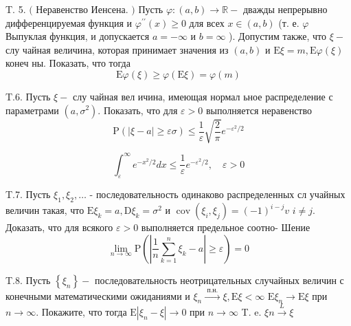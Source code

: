 \documentclass[a4paper,12pt]{article} %
\begin{document}
\begin{example}


T. 5. $($ Неравенство Иенсена. $)$ Пусть $\varphi:(a, b) \rightarrow \mathbb{R}-$ дважды непрерывно дифференцируемая функция и $\varphi^{\prime \prime}(x) \geq 0$ для всех $x \in(a, b)$ (т. е. $\varphi$ Выпуклая функция, и допускается $a=-\infty$ и $b=\infty$ ). Допустим также, что $\xi-$ слу чайная величина, которая принимает значения из $(a, b)$ и $\mathrm{E} \xi=m, \mathrm{E} \varphi(\xi)$ конеч ны. Показать, что тогда
$$
\mathrm{E} \varphi(\xi) \geq \varphi(\mathrm{E} \xi)=\varphi(m)
$$



\end{example}



\begin{example}



T.6. Пусть $\xi-$ слу чайная вел ичина, имеющая нормал ьное распределение с параметрами $\left(a, \sigma^{2}\right) .$ Показать, что для $\varepsilon>0$ выполняется неравенство
$$
\mathrm{P}(|\xi-a| \geq \varepsilon \sigma) \leq \frac{1}{\varepsilon} \sqrt{\frac{2}{\pi}} e^{-\varepsilon^{2} / 2}
$$

$$\int_{\varepsilon}^{\infty} e^{-x^{2} / 2} d x \leq \frac{1}{\varepsilon} e^{-\varepsilon^{2} / 2}, \quad \varepsilon>0$$

\end{example}



\begin{example}

T.7. Пусть $\xi_{1}, \xi_{2}, \ldots$ - последовательность одинаково распределенных сл учайных величин такая, что $\mathrm{E} \xi_{k}=a, \mathrm{D} \xi_{k}=\sigma^{2}$ и $\operatorname{cov}\left(\xi_{i}, \xi_{j}\right)=(-1)^{i-j} v$
$i \neq j .$ Доказать, что для всякого $\varepsilon>0$ выполняется предельное соотно-
Шение
$$
\lim _{n \rightarrow \infty} \mathrm{P}\left(\left|\frac{1}{n} \sum_{k=1}^{n} \xi_{k}-a\right| \geq \varepsilon\right)=0
$$




\end{example}





\begin{example}


T.8. Пусть $\left\{\xi_{n}\right\}-$ последовательность неотрицательных случайных величин с конечными математическими ожиданиями и $\xi_{n} \stackrel{\text { п.н. }}{\rightarrow} \xi, \mathrm{E} \xi<\infty$ $\mathrm{E} \xi_{n} \rightarrow \mathrm{E} \xi$ при $n \rightarrow \infty .$ Покажите, что тогда $\mathrm{E}\left|\xi_{n}-\xi\right| \rightarrow 0$ при $n \rightarrow \infty$
T. e. $\xi n \stackrel{L}{\rightarrow} \xi$



\end{example}
\end{document}
